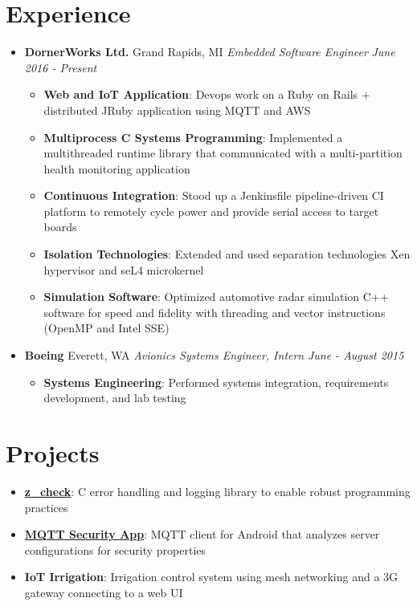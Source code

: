 \documentclass[letterpaper,11pt]{article}
\newcommand{\resumeItem}[2]{
  \item\small{
    \textbf{#1}{: #2 \vspace{-2pt}}
  }
}
\newcommand{\resumeSubheading}[4]{
  \vspace{-1pt}\item
    \textbf{#1} \dotfill #2 \newline
    \textit{\small#3} \hfill \textit{\small #4}
  \vspace{-5pt}
}
\newcommand{\resumeSubItem}[2]{\resumeItem{#1}{#2}\vspace{-4pt}}
\newcommand{\resumeSubHeadingListStart}{\begin{itemize}[leftmargin=*]}
\newcommand{\resumeSubHeadingListEnd}{\end{itemize}}
\newcommand{\resumeItemListStart}{\begin{itemize}}
\newcommand{\resumeItemListEnd}{\end{itemize}\vspace{-5pt}}
\begin{document}
\section{Experience}
  \resumeSubHeadingListStart

    \resumeSubheading
      {DornerWorks Ltd.}{Grand Rapids, MI}
      {Embedded Software Engineer}{June 2016 - Present}
      \resumeItemListStart
        \resumeItem{Web and IoT Application}
          {Devops work on a Ruby on Rails + distributed JRuby application using MQTT and AWS}
        \resumeItem{Multiprocess C Systems Programming}
          {Implemented a multithreaded runtime library that communicated with a multi-partition health monitoring application}
        \resumeItem{Continuous Integration}
          {Stood up a Jenkinsfile pipeline-driven CI platform to remotely cycle power and provide serial access to target boards}
        \resumeItem{Isolation Technologies}
          {Extended and used separation technologies Xen hypervisor and seL4 microkernel}
        \resumeItem{Simulation Software}
          {Optimized automotive radar simulation C++ software for speed and fidelity with threading and vector instructions (OpenMP and Intel SSE)}
      \resumeItemListEnd

    \resumeSubheading
      {Boeing}{Everett, WA}
      {Avionics Systems Engineer, Intern}{June - August 2015}
      \resumeItemListStart
        \resumeItem{Systems Engineering}
          {Performed systems integration, requirements development, and lab testing}
      \resumeItemListEnd

  \resumeSubHeadingListEnd


\section{Projects}
  \resumeSubHeadingListStart
    \resumeSubItem{\href{https://github.com/kkredit/z_check}{z\_check}}
      {C error handling and logging library to enable robust programming practices}
    \resumeSubItem{\href{https://github.com/kkredit/MQTT-sweeper-android}{MQTT Security App}}
      {MQTT client for Android that analyzes server configurations for security properties}
    \resumeSubItem{IoT Irrigation}
      {Irrigation control system using mesh networking and a 3G gateway connecting to a web UI}
  \resumeSubHeadingListEnd
\end{document}
